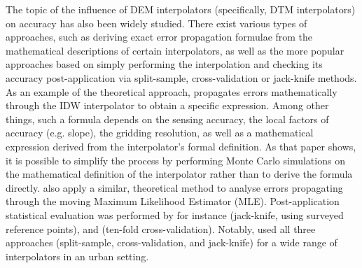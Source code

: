 The topic of the influence of DEM interpolators (specifically, DTM interpolators) on accuracy has also been widely studied. There exist various types of approaches, such as deriving exact error propagation formulae from the mathematical descriptions of certain interpolators, as well as the more popular approaches based on simply performing the interpolation and checking its accuracy post-application via split-sample, cross-validation or jack-knife methods. As an example of the theoretical approach, \cite{aguilar_etal_2010} propagates errors mathematically through the IDW interpolator to obtain a specific expression. Among other things, such a formula depends on the sensing accuracy, the local factors of accuracy (e.g. slope), the gridding resolution, as well as a mathematical expression derived from the interpolator’s formal definition. As that paper shows, it is possible to simplify the process by performing Monte Carlo simulations on the mathematical definition of the interpolator rather than to derive the formula directly. \cite{kraus_etal_2006} also apply a similar, theoretical method to analyse errors propagating through the moving Maximum Likelihood Estimator (MLE). Post-application statistical evaluation was performed by for instance \cite{peng_shih_2006} (jack-knife, using surveyed reference points), and \cite{guo_etal_2010} (ten-fold cross-validation). Notably, \cite{smith_etal_2005} used all three approaches (split-sample, cross-validation, and jack-knife) for a wide range of interpolators in an urban setting.
